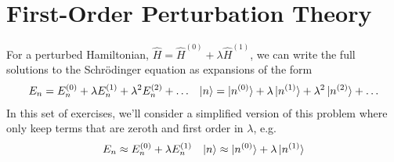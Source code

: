 \section*{First-Order Perturbation Theory}

	For a perturbed Hamiltonian, $\hat H = \hat H^{(0)} + \lambda \hat H^{(1)}$, we can write the full solutions to the Schr\"odinger equation as expansions of the form
	\begin{align*}
		E_n = E_n^{(0)} + \lambda E_n^{(1)} + \lambda^2 E_n^{(2)} + \dots & & \ket{n} = \ket{n^{(0)}} + \lambda\ket{n^{(1)}} + \lambda^2 \ket{n^{(2)}} + \dots
	\end{align*}
	In this set of exercises, we'll consider a simplified version of this problem where only keep terms that are zeroth and first order in $\lambda$, e.g.
	\begin{align*}
		E_n \approx E_n^{(0)} + \lambda E_n^{(1)} & & \ket{n} \approx \ket{n^{(0)}} + \lambda\ket{n^{(1)}}
	\end{align*}

